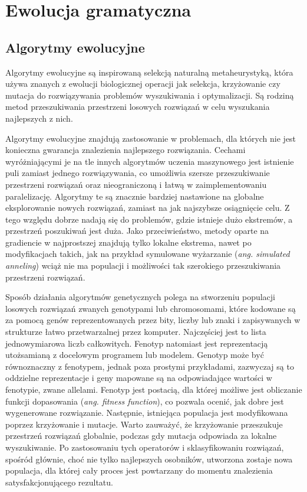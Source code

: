 
\section{Ewolucja gramatyczna}
\label{sec:ewolucjaGramatyczna}
\subsection{Algorytmy ewolucyjne}
Algorytmy ewolucyjne \cite{EA} są inspirowaną selekcją naturalną metaheurystyką, która używa znanych z ewolucji biologicznej operacji jak selekcja, krzyżowanie czy mutacja do rozwiązywania problemów wyszukiwania i optymalizacji. Są rodziną metod przeszukiwania przestrzeni losowych rozwiązań w celu wyszukania najlepszych z nich. 

Algorytmy ewolucyjne znajdują zastosowanie w problemach, dla których nie jest konieczna gwarancja znalezienia najlepszego rozwiązania. Cechami wyróżniającymi je na tle innych algorytmów uczenia maszynowego jest istnienie puli zamiast jednego rozwiązywania, co umożliwia szersze przeszukiwanie przestrzeni rozwiązań oraz nieograniczoną i łatwą w zaimplementowaniu paralelizację. Algorytmy te są znacznie bardziej nastawione na globalne eksplorowanie nowych rozwiązań, zamiast na jak najszybsze osiągnięcie celu. Z tego względu dobrze nadają się do problemów, gdzie istnieje dużo ekstremów, a przestrzeń poszukiwań jest duża. Jako przeciwieństwo, metody oparte na gradiencie w najprostszej znajdują tylko lokalne ekstrema, nawet po modyfikacjach takich, jak na przykład symulowane wyżarzanie (\textit{ang. simulated anneling}) wciąż nie ma populacji i możliwości tak szerokiego przeszukiwania przestrzeni rozwiązań.

Sposób działania algorytmów genetycznych polega na stworzeniu populacji losowych rozwiązań zwanych genotypami lub chromosomami, które kodowane są za pomocą genów reprezentowanych przez bity, liczby lub znaki i zapisywanych w strukturze łatwo przetwarzalnej przez komputer. Najczęściej jest to lista jednowymiarowa liczb całkowitych. Fenotyp natomiast jest reprezentacją utożsamianą z docelowym programem lub modelem. Genotyp może być równoznaczny z fenotypem, jednak poza prostymi przykładami, zazwyczaj są to oddzielne reprezentacje i geny mapowane są na odpowiadające wartości w fenotypie, zwane allelami. Fenotyp jest postacią, dla której możliwe jest obliczanie funkcji dopasowania (\textit{ang. fitness function}), co pozwala ocenić, jak dobre jest wygenerowane rozwiązanie. Następnie, istniejąca populacja jest modyfikowana poprzez krzyżowanie i mutacje. Warto zauważyć, że krzyżowanie przeszukuje przestrzeń rozwiązań globalnie, podczas gdy mutacja odpowiada za lokalne wyszukiwanie. Po zastosowaniu tych operatorów i sklasyfikowaniu rozwiązań, spośród głównie, choć nie tylko najlepszych osobników, utworzona zostaje nowa populacja, dla której cały proces jest powtarzany do momentu znalezienia satysfakcjonującego rezultatu.


